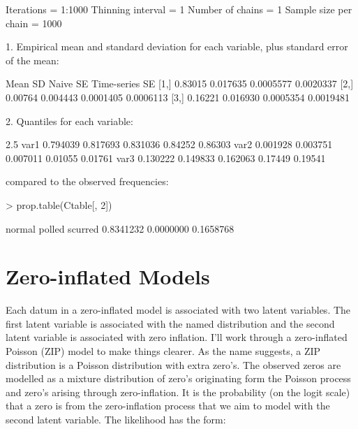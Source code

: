 \documentclass{article}
\begin{document}
\begin{Schunk}
\begin{Soutput}
Iterations = 1:1000
Thinning interval = 1 
Number of chains = 1 
Sample size per chain = 1000 

1. Empirical mean and standard deviation for each variable,
   plus standard error of the mean:

        Mean       SD  Naive SE Time-series SE
[1,] 0.83015 0.017635 0.0005577      0.0020337
[2,] 0.00764 0.004443 0.0001405      0.0006113
[3,] 0.16221 0.016930 0.0005354      0.0019481

2. Quantiles for each variable:

         2.5%
var1 0.794039 0.817693 0.831036 0.84252 0.86303
var2 0.001928 0.003751 0.007011 0.01055 0.01761
var3 0.130222 0.149833 0.162063 0.17449 0.19541
\end{Soutput}
\end{Schunk}

compared to the observed frequencies:

\begin{Schunk}
\begin{Sinput}
> prop.table(Ctable[, 2])
\end{Sinput}
\begin{Soutput}
   normal    polled   scurred 
0.8341232 0.0000000 0.1658768 
\end{Soutput}
\end{Schunk}


\section{Zero-inflated Models}

Each datum in a zero-inflated model is associated with two latent variables. The first latent variable is associated with the named distribution and the second latent variable is associated with zero inflation. I'll work through a zero-inflated Poisson (ZIP) model to make things clearer. As the name suggests, a ZIP distribution is a Poisson distribution with extra zero's. The observed zeros are modelled as a mixture distribution of zero's originating form the Poisson process and zero's arising through zero-inflation. It is the probability (on the logit scale) that a zero is from the zero-inflation process that we aim to model with the second latent variable. The likelihood has the form:
\end{document}
